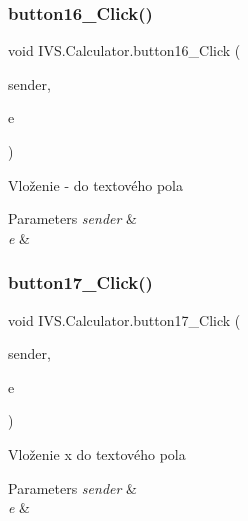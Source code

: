 \subsubsection{\texorpdfstring{button16\+\_\+\+Click()}{button16\_Click()}}
{\footnotesize\ttfamily void I\+V\+S.\+Calculator.\+button16\+\_\+\+Click (\begin{DoxyParamCaption}\item[{object}]{sender,  }\item[{Event\+Args}]{e }\end{DoxyParamCaption})\hspace{0.3cm}{\ttfamily [protected]}}



Vloženie \textquotesingle{}-\/\textquotesingle{} do textového pola 


\begin{DoxyParams}{Parameters}
{\em sender} & \\
\hline
{\em e} & \\
\hline
\end{DoxyParams}
\mbox{\label{class_i_v_s_1_1_calculator_a4aeaedb8a5683241723ba2c8a7046912}} 
\subsubsection{\texorpdfstring{button17\+\_\+\+Click()}{button17\_Click()}}
{\footnotesize\ttfamily void I\+V\+S.\+Calculator.\+button17\+\_\+\+Click (\begin{DoxyParamCaption}\item[{object}]{sender,  }\item[{Event\+Args}]{e }\end{DoxyParamCaption})\hspace{0.3cm}{\ttfamily [protected]}}



Vloženie \textquotesingle{}x\textquotesingle{} do textového pola 


\begin{DoxyParams}{Parameters}
{\em sender} & \\
\hline
{\em e} & \\
\hline
\end{DoxyParams}
\mbox{\label{class_i_v_s_1_1_calculator_ac17b0f46c51a9168ee13eb7ec43bf882}} 
